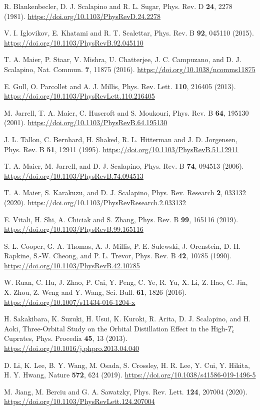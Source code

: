 \documentclass[reprint,nofootinbib,nobibnotes,amsmath,amssymb,aps,prb,floatfix]{revtex4-1}
\begin{document}
\begin{thebibliography}{99}
 R. Blankenbecler, D. J. Scalapino and  R. L. Sugar, Phys.  Rev. D {\bf 24}, 2278 (1981). \url{https://doi.org/10.1103/PhysRevD.24.2278}

 V. I. Iglovikov, E. Khatami and R. T. Scalettar, Phys. Rev. B {\bf 92}, 045110 (2015). \url{https://doi.org/10.1103/PhysRevB.92.045110}

 T. A. Maier, P. Staar, V. Mishra, U. Chatterjee, J. C. Campuzano, and D. J. Scalapino, Nat. Commun. {\bf 7}, 11875 (2016). \url{https://doi.org/10.1038/ncomms11875}

 E. Gull, O. Parcollet and A. J. Millis, Phys. Rev. Lett. {\bf 110}, 216405 (2013). \url{https://doi.org/10.1103/PhysRevLett.110.216405}

 M. Jarrell, T. A. Maier, C. Huscroft and S. Moukouri, Phys. Rev. B {\bf 64}, 195130 (2001). \url{https://doi.org/10.1103/PhysRevB.64.195130}

J. L. Tallon, C. Bernhard, H. Shaked, R. L. Hitterman and
J. D. Jorgensen, Phys. Rev. B {\bf 51}, 12911 (1995). \url{https://doi.org/10.1103/PhysRevB.51.12911}


 T. A. Maier, M. Jarrell, and D. J. Scalapino, Phys. Rev. B {\bf 74}, 094513 (2006).
\url{https://doi.org/10.1103/PhysRevB.74.094513}

 T. A. Maier, S. Karakuzu, and D. J. Scalapino, 
Phys. Rev. Research {\bf 2}, 033132 (2020). \url{https://doi.org/10.1103/PhysRevResearch.2.033132} 

 E. Vitali, H. Shi, A. Chiciak and S. Zhang, Phys. Rev. B {\bf 99}, 165116 (2019). \url{https://doi.org/10.1103/PhysRevB.99.165116}

 S. L. Cooper, G. A. Thomas, A. J. Millis, P. E. Sulewski, J. Orenstein, D. H. Rapkine, S.-W. Cheong, and P. L. Trevor, Phys. Rev. B {\bf 42}, 10785 (1990). \url{https://doi.org/10.1103/PhysRevB.42.10785}

W. Ruan, C. Hu, J. Zhao, P. Cai, Y. Peng, C. Ye, R. Yu, X. Li, Z. Hao, C. Jin, X. Zhou, Z. Weng and Y. Wang, Sci. Bull. {\bf 61}, 1826 (2016). \url{https://doi.org/10.1007/s11434-016-1204-x}

 H. Sakakibara, K. Suzuki, H. Usui, K. Kuroki, R. Arita, D. J. Scalapino, and H. Aoki, Three-Orbital Study on the Orbital Distillation Effect in the High-$T_c$ Cuprates, Phys. Procedia {\bf 45}, 13 (2013). \url{https://doi.org/10.1016/j.phpro.2013.04.040}

 D. Li, K. Lee, B. Y. Wang, M. Osada, S. Crossley, H. R. Lee, Y. Cui, Y. Hikita, H. Y. Hwang, Nature {\bf 572}, 624 (2019). \url{https://doi.org/10.1038/s41586-019-1496-5}

 M. Jiang, M. Berciu and G. A. Sawatzky, Phys. Rev. Lett. {\bf 124}, 207004 (2020). \url{https://doi.org/10.1103/PhysRevLett.124.207004}

\end{thebibliography}
\end{document}
